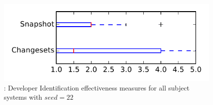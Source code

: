 
\begin{figure}
\centering
\includegraphics[height=0.4\textheight]{figures/dit_seed/rq1_tiny_22}
\caption{\rtwo: Developer Identification effectiveness measures for all subject systems with $seed=22$}
\label{fig:dit_seed:rq1:tiny}
\end{figure}
